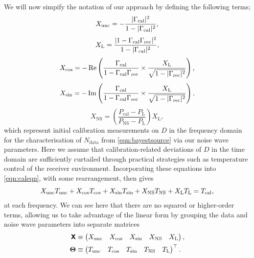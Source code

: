 We will now simpify the notation of our approach by defining the following terms;
\begin{equation}\label{eqn:xunc}
    X_{\mathrm{unc}} = -\frac{|\Gamma_{\mathrm{cal}}|^2}{ 1-|\Gamma_{\mathrm{cal}}|^2}, 
\end{equation}
\begin{equation}\label{eqn:xl}
    X_{\mathrm{L}} = \frac{|1-\Gamma_{\mathrm{cal}}\Gamma_{\mathrm{rec}}|^2}{1-|\Gamma_{\mathrm{cal}}|^2},
\end{equation}
\begin{equation}\label{eqn:xcos}
    X_{\mathrm{cos}} = -\operatorname{Re}\left(\frac{\Gamma_{\mathrm{cal}}}{1-\Gamma_{\mathrm{cal}}\Gamma_{\mathrm{rec}}} \times \frac{X_{\mathrm{L}}}{\sqrt{1-|\Gamma_{\mathrm{rec}}|^2}}\right),
\end{equation}
\begin{equation}\label{eqn:xsin}
    X_{\mathrm{sin}} = -\operatorname{Im}\left(\frac{\Gamma_{\mathrm{cal}}}{1-\Gamma_{\mathrm{cal}}\Gamma_{\mathrm{rec}}} \times \frac{X_{\mathrm{L}}}{\sqrt{1-|\Gamma_{\mathrm{rec}}|^2}}\right),
\end{equation}
\begin{equation}\label{eqn:xns}
    X_{\mathrm{NS}} = \left( \frac{P_{\mathrm{cal}}-P_{\mathrm{L}}}{P_{\mathrm{NS}}-P_{\mathrm{L}}} \right) X_{\mathrm{L}},
\end{equation}
which represent initial calibration measurements on $D$ in the frequency domain for the characterisation of $N_{\mathrm{data}}$ from \cref{eqn:bayestsource} via our noise wave parameters. Here we assume that calibration-related deviations of $D$ in the time domain are sufficiently curtailed through practical strategies such as temperature control of the receiver environment. Incorporating these equations into \cref{eqn:caleqn}, with some rearrangement, then gives
\begin{equation}
    X_{\mathrm{unc}}T_{\mathrm{unc}} + X_{\mathrm{cos}}T_{\mathrm{cos}} + X_{\mathrm{sin}}T_{\mathrm{sin}} + X_{\mathrm{NS}}T_{\mathrm{NS}} + X_{\mathrm{L}}T_{\mathrm{L}} = T_{\mathrm{cal}},
    \label{eqn:almost_expanded_cal_eqn}
\end{equation}
at each frequency. We can see here that there are no squared or higher-order terms, allowing us to take advantage of the linear form by grouping the data and noise wave parameters into separate matrices
\begin{equation} \label{eqn:theta}
    \begin{split}
    \textbf{\textsf{X}} &\equiv \begin{pmatrix} 
        X_\mathrm{unc} \quad 
        X_\mathrm{cos} \quad
        X_\mathrm{sin} \quad
        X_\mathrm{NS} \quad
        X_\mathrm{L} \end{pmatrix}, \\
    \boldsymbol{\Theta} &\equiv \begin{pmatrix} 
        T_\mathrm{unc}\quad
        T_\mathrm{cos}\quad
        T_\mathrm{sin}\quad
        T_\mathrm{NS}\quad
        T_\mathrm{L}\end{pmatrix}^\top.
    \end{split}
\end{equation}

